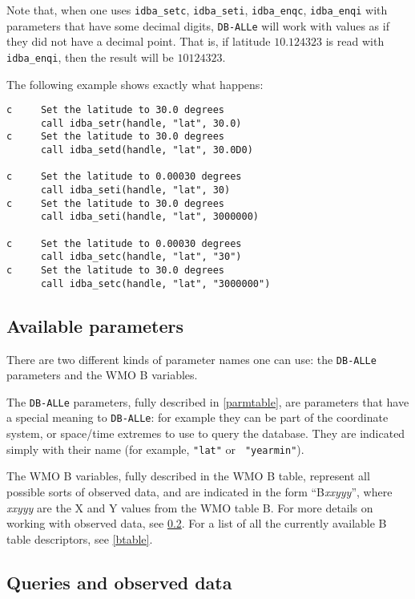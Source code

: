 \documentclass[final,12pt,a4paper,twoside]{book}
\newcommand{\dballe}{{\tt DB-ALLe}}
\begin{document}
Note that, when one uses {\tt idba\_setc}, {\tt idba\_seti}, {\tt idba\_enqc},
{\tt idba\_enqi} with parameters that have some decimal digits, \dballe{} will
work with values as if they did not have a decimal point.  That is, if latitude
$10.124323$ is read with {\tt idba\_enqi}, then the result will be $10124323$.

The following example shows exactly what happens:

\begin{verbatim}
c     Set the latitude to 30.0 degrees
      call idba_setr(handle, "lat", 30.0)
c     Set the latitude to 30.0 degrees
      call idba_setd(handle, "lat", 30.0D0)

c     Set the latitude to 0.00030 degrees
      call idba_seti(handle, "lat", 30)
c     Set the latitude to 30.0 degrees
      call idba_seti(handle, "lat", 3000000)

c     Set the latitude to 0.00030 degrees
      call idba_setc(handle, "lat", "30")
c     Set the latitude to 30.0 degrees
      call idba_setc(handle, "lat", "3000000")
\end{verbatim}

\subsection {Available parameters}

There are two different kinds of parameter names one can use: the \dballe{}
parameters and the WMO B variables.

The \dballe{} parameters, fully described in \ref{parmtable}, are parameters
that have a special meaning to \dballe{}: for example they can be part of the
coordinate system, or space/time extremes to use to query the database.  They
are indicated simply with their name (for example, {\tt "lat"} or {\tt
"yearmin"}).

The WMO B variables, fully described in the WMO B table, represent all possible
sorts of observed data, and are indicated in the form ``B{\itshape xxyyy}'',
where {\itshape xxyyy} are the X and Y values from the WMO table B.  For more
details on working with observed data, see \ref{obsdata}.  For a list of all
the currently available B table descriptors, see \ref{btable}.


\subsection{Queries and observed data}
\label{obsdata}
\end{document}
